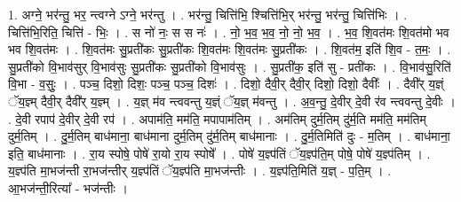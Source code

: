 \documentclass[17pt]{extarticle}
\begin{document}
1. अग्ने॒ भर॑न्तु॒ भर॒ न्त्वग्ने ऽग्ने॒ भर॑न्तु । . भर॑न्तु॒ चित्ति॑भि॒ श्चित्ति॑भि॒र् भर॑न्तु॒ भर॑न्तु॒ चित्ति॑भिः । . चित्ति॑भि॒रिति॒ चित्ति॑ - भिः॒ । . स नो॑ नः॒ स स नः॑ । . नो॒ भ॒व॒ भ॒व॒ नो॒ नो॒ भ॒व॒ । . भ॒व॒ शि॒वत॑मः शि॒वत॑मो भव भव शि॒वत॑मः । . शि॒वत॑मः सु॒प्रती॑कः सु॒प्रती॑कः शि॒वत॑मः शि॒वत॑मः सु॒प्रती॑कः । . शि॒वत॑म॒ इति॑ शि॒व - त॒मः॒ । . सु॒प्रती॑को वि॒भाव॑सुर् वि॒भाव॑सुः सु॒प्रती॑कः सु॒प्रती॑को वि॒भाव॑सुः । . सु॒प्रती॑क॒ इति॑ सु - प्रती॑कः । . वि॒भाव॑सु॒रिति॑ वि॒भा - व॒सुः॒ । . पञ्च॒ दिशो॒ दिशः॒ पञ्च॒ पञ्च॒ दिशः॑ । . दिशो॒ दैवी॒र् दैवी॒र् दिशो॒ दिशो॒ दैवीः᳚ । . दैवी᳚र् य॒ज्ञ्ं ॅय॒ज्ञ्म् दैवी॒र् दैवी᳚र् य॒ज्ञ्म् । . य॒ज्ञ् म॑व न्त्ववन्तु य॒ज्ञ्ं ॅय॒ज्ञ् म॑वन्तु । . अ॒व॒न्तु॒ दे॒वीर् दे॒वी र॑व न्त्ववन्तु दे॒वीः । . दे॒वी रपाप॑ दे॒वीर् दे॒वी रप॑ । . अपाम॑ति॒ मम॑ति॒ मपापाम॑तिम् । . अम॑तिम् दुर्म॒तिम् दु॑र्म॒ति मम॑ति॒ मम॑तिम् दुर्म॒तिम् । . दु॒र्म॒तिम् बाध॑माना॒ बाध॑माना दुर्म॒तिम् दु॑र्म॒तिम् बाध॑मानाः । . दु॒र्म॒तिमिति॑ दुः - म॒तिम् । . बाध॑माना॒ इति॒ बाध॑मानाः । . रा॒य स्पोषे॒ पोषे॑ रा॒यो रा॒य स्पोषे᳚ । . पोषे॑ य॒ज्ञ्प॑तिं ॅय॒ज्ञ्प॑ति॒म् पोषे॒ पोषे॑ य॒ज्ञ्प॑तिम् । . य॒ज्ञ्प॑ति मा॒भज॑न्ती रा॒भज॑न्तीर् य॒ज्ञ्प॑तिं ॅय॒ज्ञ्प॑ति मा॒भज॑न्तीः । . य॒ज्ञ्प॑ति॒मिति॑ य॒ज्ञ् - प॒ति॒म् । . आ॒भज॑न्ती॒रित्या᳚ - भज॑न्तीः । \newline
\end{document}
